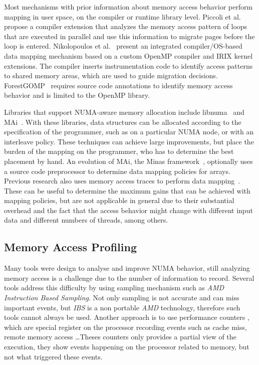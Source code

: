 Most mechanisms with prior information about memory access behavior perform mapping in user space, on the compiler or runtime library level.
Piccoli et al.~\cite{Piccoli2014} propose a compiler extension that analyzes the memory access pattern of loops that are executed in parallel and use this information to migrate pages before the loop is entered.
Nikolopoulos et al.~\cite{Nikolopoulos2000a,Nikolopoulos2000} present an integrated compiler/OS-based data mapping mechanism based on a custom OpenMP compiler and IRIX kernel extensions. The compiler inserts instrumentation code to identify access patterns to shared memory areas, which are used to guide migration decisions.
ForestGOMP~\cite{Broquedis2010a} requires source code annotations to identify memory access behavior and is limited to the OpenMP library.

Libraries that support NUMA-aware memory allocation include libnuma~\cite{Kleen2004} and MAi~\cite{Ribeiro2009}. With these libraries, data structures can be allocated according to the specification of the programmer, such as on a particular NUMA node, or with an interleave policy. These techniques can achieve large improvements, but place the burden of the mapping on the programmer, who has to determine the best placement by hand. An evolution of MAi, the Minas framework~\cite{Ribeiro2010}, optionally uses a source code preprocessor to determine data mapping policies for arrays. Previous research also uses memory access traces to perform data mapping~\cite{Diener2015,Marathe2010,Bolosky1992}. These can be useful to determine the maximum gains that can be achieved with mapping policies, but are not applicable in general due to their substantial overhead and the fact that the access behavior might change with different input data and different numbers of threads, among others.


\subsection{Memory Access Profiling}
\label{sec:soa-profiling}

Many tools were design to analyse and improve NUMA behavior, still analyzing
memory access is a challenge due to the number of information to record.
Several tools \cite{Lachaize12MemProf,McCurdy2010}  address this difficulty by
using sampling mechanism such as \emph{AMD  Instruction Based
Sampling}\cite{Drongowski07Instructionbase}. Not only sampling is not accurate
and can miss important events, but \emph{IBS} is a non portable \emph{AMD}
technology, therefore such tools cannot always be used. Another approach is to
use performance counters \cite{Majo13(Mis)understanding,
Jiang14Understanding,Bosch00Rivet, Weyers14Visualization, Tao01Visualizing},
which are special register on the processor recording events such as cache
miss, remote memory access \ldots Theses counters only provides a partial view
of the execution, they show events happening on the processor related to
memory, but not what triggered these events.

